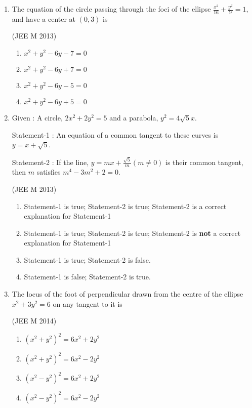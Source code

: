 \documentclass[journal,12pt,twocolumn]{IEEEtran}
\theoremstyle{remark}
\begin{document}
\begin{enumerate}
    \item The equation of the circle passing through the foci of the ellipse $\frac{x^2}{16}+\frac{y^2}{9}=1$, and have a center at $(0,3)$ is
    
    \hfill(JEE M 2013)
    
    \begin{enumerate}[label=(\alph*)]
    \item$x^2+y^2-6y-7=0$
    \item$x^2+y^2-6y+7=0$
    \item$x^2+y^2-6y-5=0$
    \item$x^2+y^2-6y+5=0$ \\
    \end{enumerate}

    \item
    Given : A circle, $2x^2+2y^2=5$ and a parabola, $y^2=4\sqrt{5}x$.
    
    Statement-1 : An equation of a common tangent to these curves is $y=x+\sqrt{5}$.
    
    Statement-2 : If the line, $y=mx+\frac{\sqrt{5}}{m} (m\neq0)$ is their common tangent, then $m$ satisfies $m^4-3m^2+2=0$.

    \hfill(JEE M 2013)
    \begin{enumerate}[label=(\alph*)]
    \item Statement-1 is true; Statement-2 is true; Statement-2 is a correct explanation for Statement-1
    \item Statement-1 is true; Statement-2 is true; Statement-2 is \textbf{not} a correct explanation for Statement-1
    \item Statement-1 is true; Statement-2 is false.
    \item Statement-1 is false; Statement-2 is true.\\
    \end{enumerate}
        
    \item The locus of the foot of perpendicular drawn from the centre of the ellipse $x^2+3y^2=6$ on any tangent to it is
    
    \hfill(JEE M 2014)
    
    \begin{enumerate}[label=(\alph*)]
    \item$\left(x^2+y^2\right)^2=6x^2+2y^2$
    \item$\left(x^2+y^2\right)^2=6x^2-2y^2$
    \item$\left(x^2-y^2\right)^2=6x^2+2y^2$
    \item$\left(x^2-y^2\right)^2=6x^2-2y^2$ \\
    \end{enumerate}


\end{enumerate}
\end{document}
